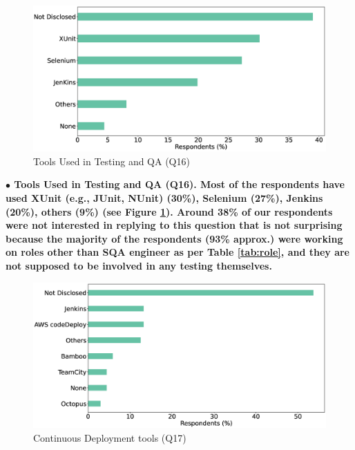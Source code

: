 \begin{figure}[h]
\centering
  \includegraphics[scale=0.18]{Figures/Respondents_testing_tools}
  \caption{Tools Used in Testing and QA (Q16)}
  \label{fig:testingTools}
\end{figure}
\nd\bf{$\bullet$ Tools Used in Testing and QA (Q16).} Most of the
respondents have used XUnit (e.g., JUnit, NUnit) (30\%), Selenium (27\%),
Jenkins (20\%), others (9\%) (see Figure \ref{fig:testingTools}). Around
38\% of our respondents were not interested in replying to this question that is
not surprising because the majority of the respondents (93\% approx.) were
working on roles other than SQA engineer as per Table \ref{tab:role}, and they
are not supposed to be involved in any testing themselves. 


\begin{figure}[h]
\centering
  \includegraphics[scale=0.18]{Figures/Respondents_deployment_tools}
  \caption{Continuous Deployment tools (Q17)}
  \label{fig:deployTools}
\end{figure}

